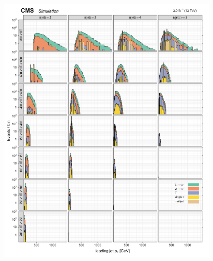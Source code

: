 \begin{figure}[!h]
\centering
\includegraphics[scale=0.95]{figures/kiplots/c150107_s150318_f015_jet_pt_0_100}
\end{figure}

